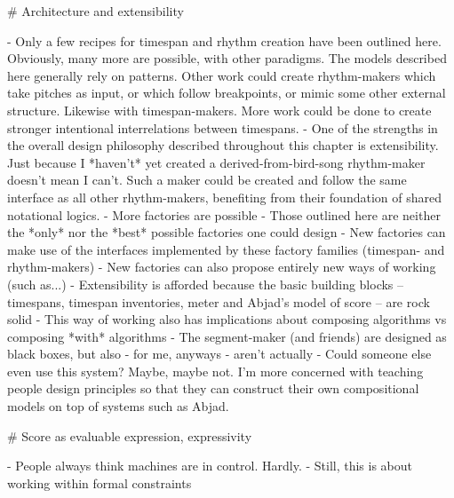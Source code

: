\begin{markdown}
# Architecture and extensibility

-   Only a few recipes for timespan and rhythm creation have been outlined
    here. Obviously, many more are possible, with other paradigms. The models
    described here generally rely on patterns. Other work could create
    rhythm-makers which take pitches as input, or which follow breakpoints, or
    mimic some other external structure. Likewise with timespan-makers. More
    work could be done to create stronger intentional interrelations between
    timespans.
-   One of the strengths in the overall design philosophy described throughout
    this chapter is extensibility. Just because I *haven't* yet created a
    derived-from-bird-song rhythm-maker doesn't mean I can't. Such a maker
    could be created and follow the same interface as all other rhythm-makers,
    benefiting from their foundation of shared notational logics.
-   More factories are possible
-   Those outlined here are neither the *only* nor the *best* possible
    factories one could design
-   New factories can make use of the interfaces implemented by these
    factory families (timespan- and rhythm-makers)
-   New factories can also propose entirely new ways of working
    (such as...)
-   Extensibility is afforded because the basic building blocks --
    timespans, timespan inventories, meter and Abjad's model of score --
    are rock solid
-   This way of working also has implications about composing algorithms vs
    composing *with* algorithms
-   The segment-maker (and friends) are designed as black boxes, but also - for
    me, anyways - aren't actually
-   Could someone else even use this system? Maybe, maybe not. I'm more
    concerned with teaching people design principles so that they can construct
    their own compositional models on top of systems such as Abjad.

# Score as evaluable expression, expressivity

-   People always think machines are in control. Hardly.
-   Still, this is about working within formal constraints

\end{markdown}